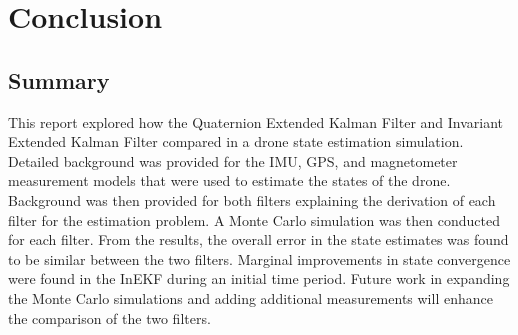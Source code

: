 \section{Conclusion}

\subsection{Summary}
This report explored how the Quaternion Extended Kalman Filter and Invariant Extended Kalman Filter compared in a drone state estimation simulation. Detailed background was provided for the IMU, GPS, and magnetometer measurement models that were used to estimate the states of the drone. Background was then provided for both filters explaining the derivation of each filter for the estimation problem. A Monte Carlo simulation was then conducted for each filter. From the results, the overall error in the state estimates was found to be similar between the two filters. Marginal improvements in state convergence were found in the InEKF during an initial time period. Future work in expanding the Monte Carlo simulations and adding additional measurements will enhance the comparison of the two filters.


